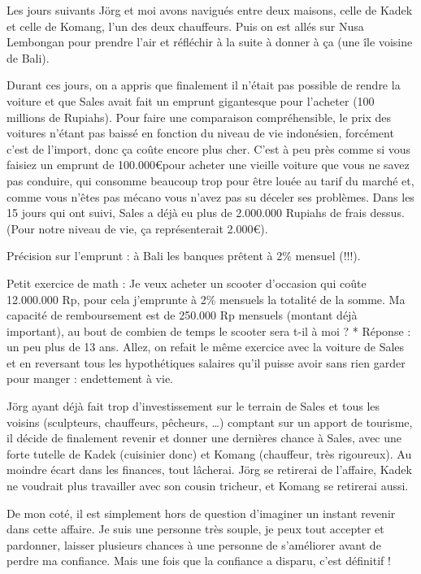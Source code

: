 Les jours suivants Jörg et moi avons navigués entre deux maisons, celle de Kadek et celle de Komang, l’un des deux chauffeurs. Puis on est allés sur Nusa Lembongan pour prendre l’air et réfléchir à la suite à donner à ça (une île voisine de Bali).

Durant ces jours, on a appris que finalement il n’était pas possible de rendre la voiture et que Sales avait fait un emprunt gigantesque pour l’acheter (100 millions de Rupiahs). Pour faire une comparaison compréhensible, le prix des voitures n’étant pas baissé en fonction du niveau de vie indonésien, forcément c’est de l’import, donc ça coûte encore plus cher. C’est à peu près comme si vous faisiez un emprunt de 100.000\euro  pour acheter une vieille voiture que vous ne savez pas conduire, qui consomme beaucoup trop pour être louée au tarif du marché et, comme vous n’êtes pas mécano vous n’avez pas su déceler ses problèmes. Dans les 15 jours qui ont suivi, Sales a déjà eu plus de 2.000.000 Rupiahs de frais dessus. (Pour notre niveau de vie, ça représenterait 2.000\euro ).

Précision sur l’emprunt : à Bali les banques prêtent à 2\% mensuel (!!!).

Petit exercice de math : Je veux acheter un scooter d’occasion qui coûte 12.000.000 Rp, pour cela j’emprunte à 2\% mensuels la totalité de la somme. Ma capacité de remboursement est de 250.000 Rp mensuels (montant déjà important), au bout de combien de temps le scooter sera t-il à moi ? * Réponse : un peu plus de 13 ans. Allez, on refait le même exercice avec la voiture de Sales et en reversant tous les hypothétiques salaires qu’il puisse avoir sans rien garder pour manger : endettement à vie.

Jörg ayant déjà fait trop d’investissement sur le terrain de Sales et tous les voisins (sculpteurs, chauffeurs, pêcheurs, …) comptant sur un apport de tourisme, il décide de finalement revenir et donner une dernières chance à Sales, avec une forte tutelle de Kadek (cuisinier donc) et Komang (chauffeur, très rigoureux). Au moindre écart dans les finances, tout lâcherai. Jörg se retirerai de l’affaire, Kadek ne voudrait plus travailler avec son cousin tricheur, et Komang se retirerai aussi.

De mon coté, il est simplement hors de question d’imaginer un instant revenir dans cette affaire. Je suis une personne très souple, je peux tout accepter et pardonner, laisser plusieurs chances à une personne de s’améliorer avant de perdre ma confiance. Mais une fois que la confiance a disparu, c’est définitif !

